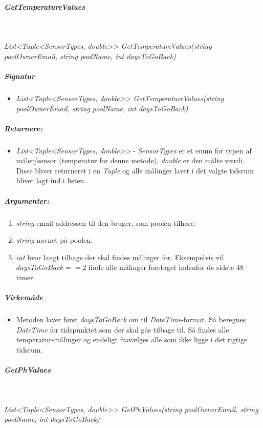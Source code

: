 \subparagraph{GetTemperatureValues}\ %

\textit{List<Tuple<SensorTypes, double>> GetTemperatureValues(string poolOwnerEmail, string poolName, int daysToGoBack)}





\subparagraph{Signatur}
\begin{itemize}
	\item \textit{List<Tuple<SensorTypes, double>> GetTemperatureValues(string poolOwnerEmail, string poolName, int daysToGoBack)}
\end{itemize}

\subparagraph{Returnere:}
\begin{itemize}
	\item \textit{List<Tuple<SensorTypes, double>>} - \textit{SensorTypes} er et enum for typen af måler/sensor (temperatur for denne metode), \textit{double} er den målte værdi. Disse bliver returneret i en \textit{Tuple} og alle målinger lavet i det valgte tidsrum bliver lagt ind i listen.
\end{itemize}

\subparagraph{Argumenter:}
\begin{enumerate}
	\item \textit{string} email addressen til den bruger, som poolen tilhøre.
	\item \textit{string} navnet på poolen.
	\item \textit{int} hvor langt tilbage der skal findes målinger for. Eksempelvis vil $daysToGoBack == 2$ finde alle målinger foretaget indenfor de sidste 48 timer.
\end{enumerate}

\subparagraph{Virkemåde}
\begin{itemize}
	\item Metoden laver først \textit{daysToGoBack} om til \textit{DateTime}-format. Så beregnes \textit{DateTime} for tidspunktet som der skal gås tilbage til. Så findes alle temperatur-målinger og endeligt fravælges alle som ikke ligge i det rigtige tidsrum.
\end{itemize}







\subparagraph{GetPhValues}\ %

\textit{List<Tuple<SensorTypes, double>> GetPhValues(string poolOwnerEmail, string poolName, int daysToGoBack)}










